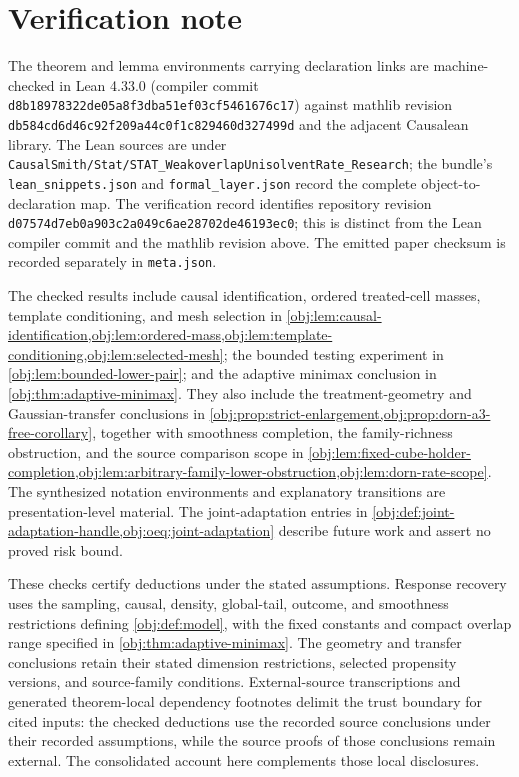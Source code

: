 \section{Verification note}

The theorem and lemma environments carrying declaration links are machine-checked in Lean 4.33.0 (compiler commit \texttt{d8b18978322de05a8f3dba51ef03cf5461676c17}) against mathlib revision \texttt{db584cd6d46c92f209a44c0f1c829460d327499d} and the adjacent Causalean library. The Lean sources are under \texttt{CausalSmith/Stat/STAT\_WeakoverlapUnisolventRate\_Research}; the bundle's \texttt{lean\_snippets.json} and \texttt{formal\_layer.json} record the complete object-to-declaration map. The verification record identifies repository revision \texttt{d07574d7eb0a903c2a049c6ae28702de46193ec0}; this is distinct from the Lean compiler commit and the mathlib revision above. The emitted paper checksum is recorded separately in \texttt{meta.json}.

The checked results include causal identification, ordered treated-cell masses, template conditioning, and mesh selection in \cref{obj:lem:causal-identification,obj:lem:ordered-mass,obj:lem:template-conditioning,obj:lem:selected-mesh}; the bounded testing experiment in \cref{obj:lem:bounded-lower-pair}; and the adaptive minimax conclusion in \cref{obj:thm:adaptive-minimax}. They also include the treatment-geometry and Gaussian-transfer conclusions in \cref{obj:prop:strict-enlargement,obj:prop:dorn-a3-free-corollary}, together with smoothness completion, the family-richness obstruction, and the source comparison scope in \cref{obj:lem:fixed-cube-holder-completion,obj:lem:arbitrary-family-lower-obstruction,obj:lem:dorn-rate-scope}. The synthesized notation environments and explanatory transitions are presentation-level material. The joint-adaptation entries in \cref{obj:def:joint-adaptation-handle,obj:oeq:joint-adaptation} describe future work and assert no proved risk bound.

These checks certify deductions under the stated assumptions. Response recovery uses the sampling, causal, density, global-tail, outcome, and smoothness restrictions defining \cref{obj:def:model}, with the fixed constants and compact overlap range specified in \cref{obj:thm:adaptive-minimax}. The geometry and transfer conclusions retain their stated dimension restrictions, selected propensity versions, and source-family conditions. External-source transcriptions and generated theorem-local dependency footnotes delimit the trust boundary for cited inputs: the checked deductions use the recorded source conclusions under their recorded assumptions, while the source proofs of those conclusions remain external. The consolidated account here complements those local disclosures.
